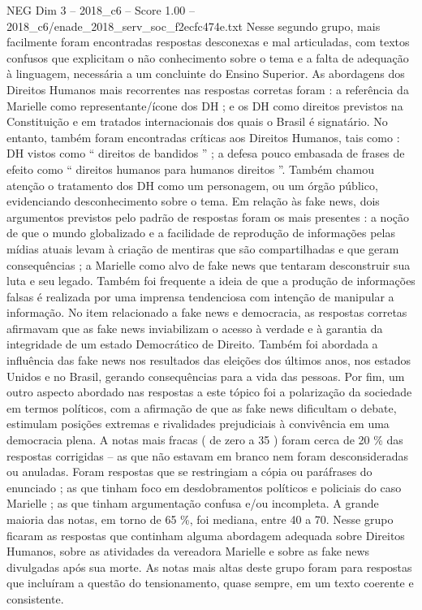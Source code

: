 \begin{textsample}{NEG Dim 3 – 2018\_c6 – Score 1.00 – 2018\_c6/enade\_2018\_serv\_soc\_f2ecfc474e.txt}
Nesse segundo grupo, mais facilmente foram encontradas respostas desconexas e mal articuladas, com textos confusos que explicitam o não conhecimento sobre o tema e a falta de adequação à linguagem, necessária a um concluinte do Ensino Superior.
As abordagens dos Direitos Humanos mais recorrentes nas respostas corretas foram : a referência da Marielle como representante/ícone dos DH ; e os DH como direitos previstos na Constituição e em tratados internacionais dos quais o Brasil é signatário.
No entanto, também foram encontradas críticas aos Direitos Humanos, tais como : DH vistos como “ direitos de bandidos ” ; a defesa pouco embasada de frases de efeito como “ direitos humanos para humanos direitos ”.
Também chamou atenção o tratamento dos DH como um personagem, ou um órgão público, evidenciando desconhecimento sobre o tema.
Em relação às fake news, dois argumentos previstos pelo padrão de respostas foram os mais presentes : a noção de que o mundo globalizado e a facilidade de reprodução de informações pelas mídias atuais levam à criação de mentiras que são compartilhadas e que geram consequências ; a Marielle como alvo de fake news que tentaram desconstruir sua luta e seu legado.
Também foi frequente a ideia de que a produção de informações falsas é realizada por uma imprensa tendenciosa com intenção de manipular a informação.
No item relacionado a fake news e democracia, as respostas corretas afirmavam que as fake news inviabilizam o acesso à verdade e à garantia da integridade de um estado Democrático de Direito.
Também foi abordada a influência das fake news nos resultados das eleições dos últimos anos, nos estados Unidos e no Brasil, gerando consequências para a vida das pessoas.
Por fim, um outro aspecto abordado nas respostas a este tópico foi a polarização da sociedade em termos políticos, com a afirmação de que as fake news dificultam o debate, estimulam posições extremas e rivalidades prejudiciais à convivência em uma democracia plena.
A notas mais fracas ( de zero a 35 ) foram cerca de 20 \% das respostas corrigidas – as que não estavam em branco nem foram desconsideradas ou anuladas.
Foram respostas que se restringiam a cópia ou paráfrases do enunciado ; as que tinham foco em desdobramentos políticos e policiais do caso Marielle ; as que tinham argumentação confusa e/ou incompleta.
A grande maioria das notas, em torno de 65 \%, foi mediana, entre 40 a 70.
Nesse grupo ficaram as respostas que continham alguma abordagem adequada sobre Direitos Humanos, sobre as atividades da vereadora Marielle e sobre as fake news divulgadas após sua morte.
As notas mais altas deste grupo foram para respostas que incluíram a questão do tensionamento, quase sempre, em um texto coerente e consistente.

\end{textsample}
